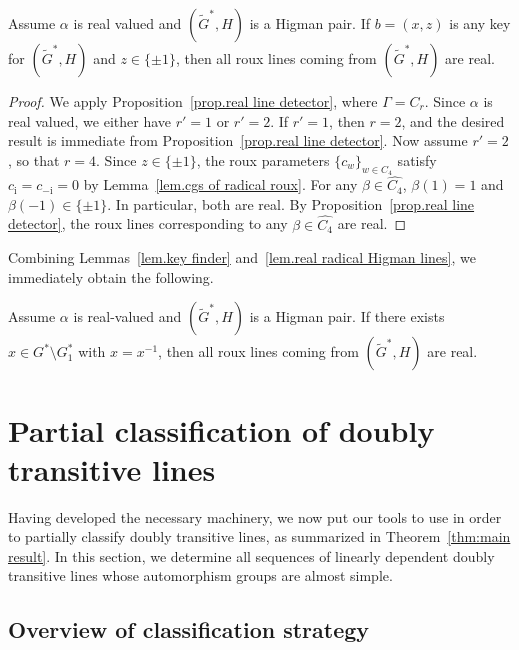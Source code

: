 \begin{lemma}
\label{lem.real radical Higman lines}
Assume $\alpha$ is real valued and $(\widetilde{G}^*,H)$ is a Higman pair.
If $b=(x,z)$ is any key for $(\widetilde{G}^*,H)$ and $z \in \{\pm1\}$, then all roux lines coming from $(\widetilde{G}^*,H)$ are real.
\end{lemma}

\begin{proof}
We apply Proposition~\ref{prop.real line detector}, where $\Gamma = C_r$.
Since $\alpha$ is real valued, we either have $r' = 1$ or $r'=2$.
If $r'=1$, then $r=2$, and the desired result is immediate from Proposition~\ref{prop.real line detector}.
Now assume $r'=2$, so that $r=4$.
Since $z \in \{ \pm 1 \}$, the roux parameters $\{ c_w \}_{w \in C_4}$ satisfy $c_{\mathrm{i}} = c_{-\mathrm{i}} = 0$ by Lemma~\ref{lem.cgs of radical roux}.
For any $\beta \in \widehat{C_4}$, $\beta(1) = 1$ and $\beta(-1) \in \{ \pm 1 \}$.
In particular, both are real.
By Proposition~\ref{prop.real line detector}, the roux lines corresponding to any $\beta \in \widehat{C_4}$ are real.
\end{proof}

Combining Lemmas~\ref{lem.key finder} and~\ref{lem.real radical Higman lines}, we immediately obtain the following.

\begin{lemma}
\label{lem:real involution}
Assume $\alpha$ is real-valued and $(\widetilde{G}^*,H)$ is a Higman pair.
If there exists $x \in G^* \setminus G_1^*$ with $x = x^{-1}$, then all roux lines coming from $(\widetilde{G}^*,H)$ are real.
\end{lemma}






\section{Partial classification of doubly transitive lines}

Having developed the necessary machinery, we now put our tools to use in order to partially classify doubly transitive lines, as summarized in Theorem~\ref{thm:main result}.
In this section, we determine all sequences of linearly dependent doubly transitive lines whose automorphism groups are almost simple.

\subsection{Overview of classification strategy}

